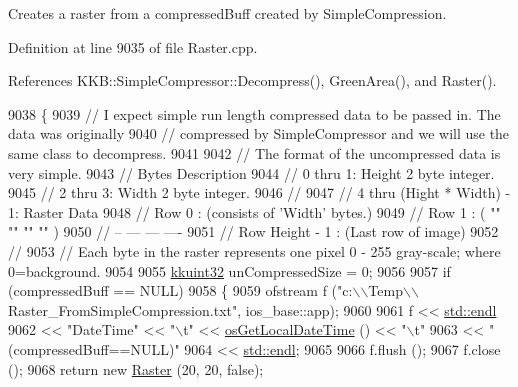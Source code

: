 Creates a raster from a compressed\+Buff created by \textquotesingle{}Simple\+Compression\textquotesingle{}. 



Definition at line 9035 of file Raster.\+cpp.



References K\+K\+B\+::\+Simple\+Compressor\+::\+Decompress(), Green\+Area(), and Raster().


\begin{DoxyCode}
9038 \{
9039   \textcolor{comment}{// I expect simple run length compressed data to be passed in.  The data was  originally }
9040   \textcolor{comment}{// compressed by SimpleCompressor and we will use the same class to decompress.}
9041 
9042   \textcolor{comment}{// The format of the uncompressed data is very simple.}
9043   \textcolor{comment}{//  Bytes    Description}
9044   \textcolor{comment}{//  0 thru 1:    Height   2 byte integer.}
9045   \textcolor{comment}{//  2 thru 3:    Width    2 byte integer.}
9046   \textcolor{comment}{//}
9047   \textcolor{comment}{//  4 thru (Hight * Width) - 1:   Raster Data}
9048   \textcolor{comment}{//          Row 0          : (consists of 'Width' bytes.)}
9049   \textcolor{comment}{//          Row 1          : (    ""    ""    ""   ""   )}
9050   \textcolor{comment}{//                   --     ---     ---     ----   }
9051   \textcolor{comment}{//          Row Height - 1 : (Last row of image) }
9052   \textcolor{comment}{//}
9053   \textcolor{comment}{//          Each byte in the raster represents one pixel 0 - 255 gray-scale;  where 0=background.}
9054 
9055   \hyperlink{namespace_k_k_b_af8d832f05c54994a1cce25bd5743e19a}{kkuint32}  unCompressedSize = 0;
9056 
9057   \textcolor{keywordflow}{if}  (compressedBuff == NULL)
9058   \{
9059     ofstream f (\textcolor{stringliteral}{"c:\(\backslash\)\(\backslash\)Temp\(\backslash\)\(\backslash\)Raster\_FromSimpleCompression.txt"}, ios\_base::app);
9060 
9061     f << \hyperlink{namespace_k_k_b_ad1f50f65af6adc8fa9e6f62d007818a8}{std::endl}
9062       << \textcolor{stringliteral}{"DateTime"}                 << \textcolor{stringliteral}{"\(\backslash\)t"}  <<  \hyperlink{namespace_k_k_b_af54c205cde0465bcb2c74f3881a96413}{osGetLocalDateTime} () << \textcolor{stringliteral}{"\(\backslash\)t"}
9063       << \textcolor{stringliteral}{"(compressedBuff==NULL)"}
9064       << \hyperlink{namespace_k_k_b_ad1f50f65af6adc8fa9e6f62d007818a8}{std::endl};
9065 
9066     f.flush ();
9067     f.close ();
9068     \textcolor{keywordflow}{return} \textcolor{keyword}{new} \hyperlink{class_k_k_b_1_1_raster_a19ec88efff547c1fcda863172fef620b}{Raster} (20, 20, \textcolor{keyword}{false});

\end{DoxyCode}

